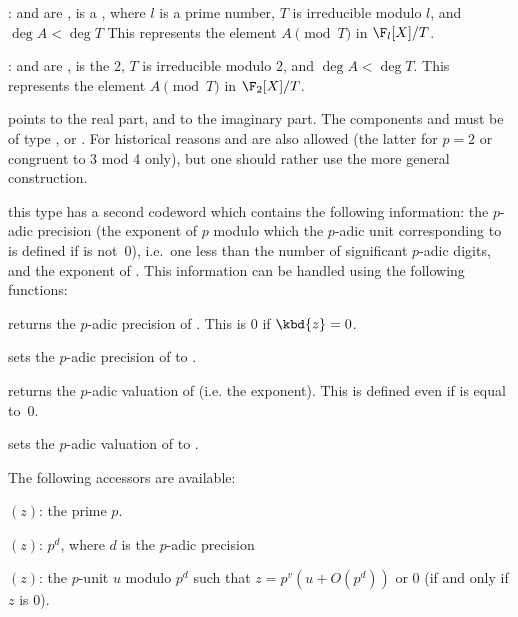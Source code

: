 \item {}:  and  are ,
 is a , where $l$ is a prime number, $T$ is irreducible
modulo $l$, and $\deg A < \deg T$ This represents the element $A\pmod{T}$ in
$\F_l[X]/T$.

\item {}:  and  are ,
 is the  $2$, $T$ is irreducible modulo $2$, and
$\deg A < \deg T$. This represents the element $A\pmod{T}$ in $\F_2[X]/T$.

%
 points to the real part, and  to the imaginary part.
The components  and  must be of type
,  or . For historical reasons 
and  are also allowed (the latter for $p = 2$ or
congruent to 3 mod 4 only), but one should rather use the more general
 construction.

%
 this type has a second codeword
 which contains the following information: the $p$-adic precision
(the exponent of $p$ modulo which the $p$-adic unit corresponding to
 is defined if  is not~0), i.e.~one less than the number of
significant $p$-adic digits, and the exponent of . This information
can be handled using the following functions:

 returns the $p$-adic precision of . This is
$0$ if $\kbd{z} = 0$.

 sets the $p$-adic precision of 
to .

 returns the $p$-adic valuation of 
(i.e. the exponent). This is defined even if  is equal to~0.

 sets the $p$-adic valuation of 
to .

The following accessors are available:

\item {}$(z)$: the prime $p$.

\item {}$(z)$: $p^d$, where $d$ is the $p$-adic precision

\item {}$(z)$: the $p$-unit $u$ modulo $p^d$
such that $z = p^v(u + O(p^d))$ or $0$ (if and only if $z$ is $0$).

